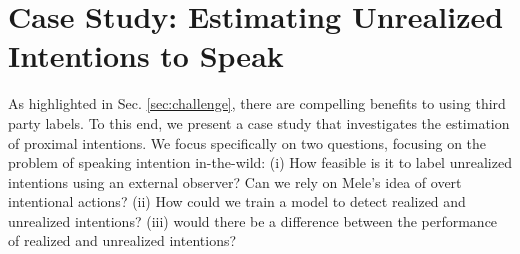 \documentclass[manuscript,screen,review]{acmart}
\begin{document}















\section{Case Study: Estimating Unrealized Intentions to Speak} \label{sec:case}
As highlighted in Sec. \ref{sec:challenge}, there are compelling benefits to using third party labels. To this end, we present a case study that investigates the estimation of proximal intentions. We focus specifically on two questions, focusing on the problem of speaking intention in-the-wild: (i) How feasible is it to label unrealized intentions using an external observer? Can we rely on Mele's idea of overt intentional actions\cite{mele1992springs}? (ii) How could we train a model to detect realized and unrealized intentions? (iii) would there be a difference between the performance of realized and unrealized intentions?
\end{document}
